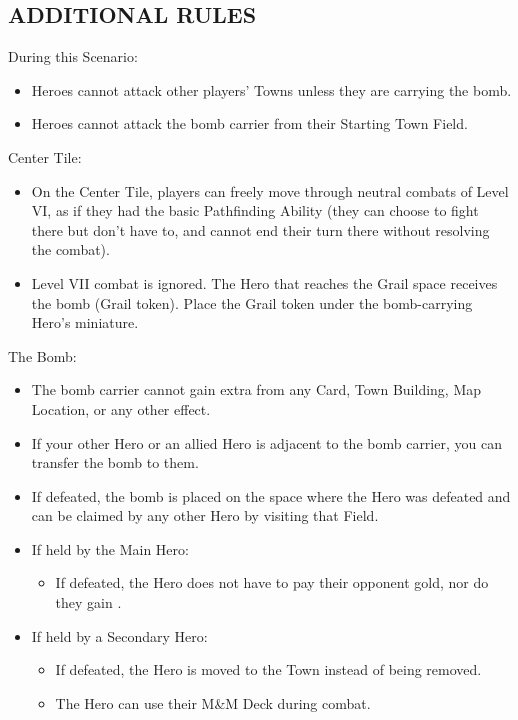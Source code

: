 \begin{multicols}{2}
\newpage

\subsection*{\MakeUppercase{Additional Rules}}

During this Scenario:

\begin{itemize}
  \item Heroes cannot attack other players' Towns unless they are carrying the bomb.
  \item Heroes cannot attack the bomb carrier from their Starting Town Field.
\end{itemize}

Center Tile:

\begin{itemize}
  \item On the Center Tile, players can freely move through neutral combats of Level VI, as if they had the basic Pathfinding Ability (they can choose to fight there but don't have to, and cannot end their turn there without resolving the combat).
  \item Level VII combat is ignored. The Hero that reaches the Grail space receives the bomb (Grail token). Place the Grail token under the bomb-carrying Hero's miniature.
\end{itemize}

The Bomb:

\begin{itemize}
  \item The bomb carrier cannot gain extra  from any Card, Town Building, Map Location, or any other effect.
  \item If your other Hero or an allied Hero is adjacent to the bomb carrier, you can transfer the bomb to them.
  \item If defeated, the bomb is placed on the space where the Hero was defeated and can be claimed by any other Hero by visiting that Field.
  \item If held by the Main Hero:
  \begin{itemize}
    \item If defeated, the Hero does not have to pay their opponent gold, nor do they gain .
  \end{itemize}
  \item If held by a Secondary Hero:
  \begin{itemize}
    \item If defeated, the Hero is moved to the Town instead of being removed.
    \item The Hero can use their M\&M Deck during combat.
  \end{itemize}
\end{itemize}


\end{multicols}

